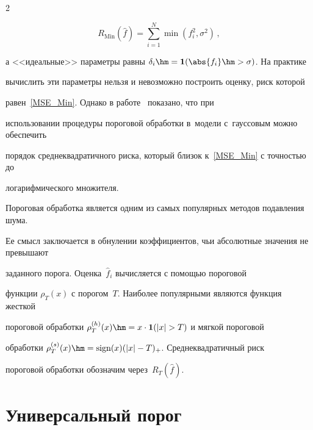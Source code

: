\begin{multicols}{2}
\vspace*{-2pt}



\noindent

\begin{equation}

\label{MSE_Min}

R_{\mathrm{Min}}(\hat{f})=\sum\limits_{i=1}^{N}\min\left(f_i^2,\sigma^2\right)\,,

\end{equation}

а <<идеальные>> параметры равны $\delta_i\hm=\It(\abs{f_i}\hm>\sigma)$. На практике 

вычислить эти параметры нельзя и невозможно построить оценку, риск которой 

равен~\eqref{MSE_Min}. Однако в работе~\cite{DonJ94} показано, что при 

использовании процедуры пороговой обработки в~модели с~гауссовым можно обеспечить 

порядок сред\-не\-квад\-ра\-тич\-но\-го риска, который близок к~\eqref{MSE_Min} с точностью до 

логарифмического множителя.



Пороговая обработка является одним из самых популярных методов подавления шума. 

Ее смысл заключается в обнулении коэффициентов, чьи абсолютные значения не превышают 

заданного порога. Оценка~$\hat{f}_i$ вычисляется с помощью пороговой 

функции $\rho_T(x)$ с порогом~$T$. Наиболее популярными являются функция жесткой 

пороговой обработки $\rho_T^{(h)}(x)\hm=x \cdot\mathbf{1} (|x|>T)$ и мягкой пороговой 

обработки $\rho_T^{(s)}(x)\hm={\mbox{sign}}(x)(|x|-T)_+$. Сред\-не\-квад\-ра\-тич\-ный риск 

пороговой обработки обозначим через~$R_T(\hat{f})$.



\vspace*{-2pt}



\section{Универсальный порог}



\vspace*{-2pt}




\end{multicols}
